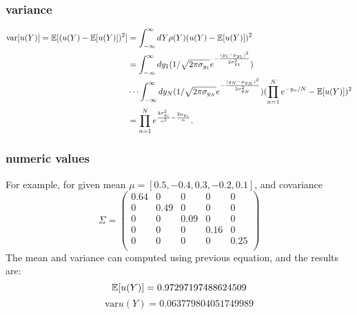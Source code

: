 \subsubsection{variance}
\begin{align}
\text{var}[u(Y)]=\mathbb{E}[ (u(Y)-\mathbb{E}[ u(Y)])^2] &= \int_{-\infty}^\infty dY \rho(Y)(u(Y)-\mathbb{E}[ u(Y)])^2 \notag \\
  &=\int_{-\infty}^\infty dy_1 (1/\sqrt{2 \pi \sigma_{y_1}}e^{-\frac{(y_1-\mu_{y_1})^2}{2\sigma_{y_1}^2}})\\
  &\cdots\int_{-\infty}^\infty dy_N  (1/\sqrt{2 \pi \sigma_{y_N}}e^{-\frac{(y_N-\mu_{y_N})^2}{2\sigma_{y_N}^2}})(\prod_{n=1}^N e^{-y_n/N}-\mathbb{E}[ u(Y)])^2 \notag\\
  &=\prod_{n=1}^N e^{\frac{2 \sigma_{y_i}^2}{n^2}-\frac{2\mu_{y_i}}{n}}. \notag
\end{align}
\subsubsection{numeric values}
For example, for given mean $\mu = [0.5, -0.4, 0.3, -0.2, 0.1]$, and covariance
\begin{equation}
\Sigma =
\begin{pmatrix}
0.64 & 0 & 0 & 0 & 0 \\
0 & 0.49 & 0 & 0 & 0 \\
0 & 0 & 0.09 & 0 & 0 \\
0 & 0 & 0 & 0.16 & 0 \\
0 & 0 & 0 & 0 & 0.25 \\
\end{pmatrix}
\end{equation}
The mean and variance can computed using previous equation, and the results are:
\begin{equation}
\mathbb{E}[ u(Y)] = 0.97297197488624509
\end{equation}
\begin{equation}
\text{var}{u(Y)} = 0.063779804051749989
\end{equation}
